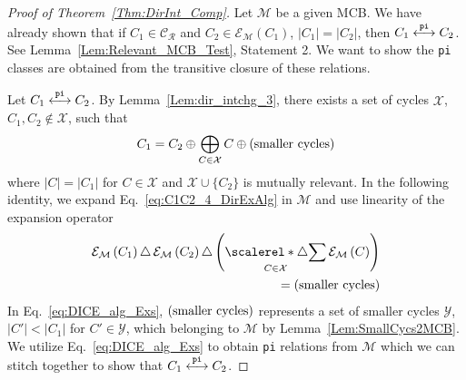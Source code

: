 \documentclass[fleqn,11pt]{article}
\newcommand\calM{\mathcal{M}}
\newcommand\calP{\mathcal{P}}     %
\newcommand\calX{\mathcal{X}}     %
\newcommand\calY{\mathcal{Y}}
\newcommand\RelCyc{\mathcal{C_R}} %
\newcommand\expand[2]{\mathcal{E}_{#1}\left(#2\right)}   %
\newcommand\symdiff{\mathop{\triangle}}
\DeclareMathOperator*{\symdiffseries}{\scalerel*{\triangle}{\sum}}
\newcommand\pInt{ \stackrel{\tt pi}{\longleftrightarrow} }
\newcommand\smCyc{\textnormal{(smaller cycles)}}
\begin{document}
\begin{proof}[Proof of Theorem~\ref{Thm:DirInt_Comp}]
	Let $\calM$ be a given MCB. 
	We have already shown that if $C_1\in\RelCyc$ and $C_2\in\expand{\calM}{C_1}$, $|C_1|=|C_2|$, then $C_1\pInt C_2$. 
	See Lemma~\ref{Lem:Relevant_MCB_Test}, Statement 2. We want to show the {\tt pi} classes are obtained from the transitive closure of these relations.
	
	Let $C_1\pInt C_2$. 
	By Lemma~\ref{Lem:dir_intchg_3}, there exists a set of cycles $\calX$, $C_1,C_2\notin\calX$, such that
	\begin{equation}
		C_1 = C_2 \oplus\bigoplus_{C\in\calX}C\oplus\smCyc
		\label{eq:C1C2_4_DirExAlg}
	\end{equation}
	where $|C|=|C_1|$ for $C\in\calX$ and $\calX\cup\{C_2\}$ is mutually relevant. 
	In the following identity, we expand Eq.~\eqref{eq:C1C2_4_DirExAlg} in $\calM$ and use linearity of the expansion operator
	\begin{equation}
		\begin{split}
		\expand{\calM}{C_1}\symdiff\expand{\calM}{C_2}\symdiff\left(\symdiffseries_{C\in\calX}\expand{\calM}{C}\right) \\= \smCyc
		\end{split}
		\label{eq:DICE_alg_Exs}
	\end{equation}
	In Eq.~\eqref{eq:DICE_alg_Exs}, $\smCyc$ represents a set of smaller cycles $\calY$, $|C'|<|C_1|$ for $C'\in\calY$, which 
	belonging to $\calM$ by Lemma~\ref{Lem:SmallCycs2MCB}.
	We utilize Eq.~\eqref{eq:DICE_alg_Exs} to obtain {\tt pi} relations from $\calM$ which we can stitch together to show that $C_1\pInt C_2$.%
	

\end{proof}
\end{document}
